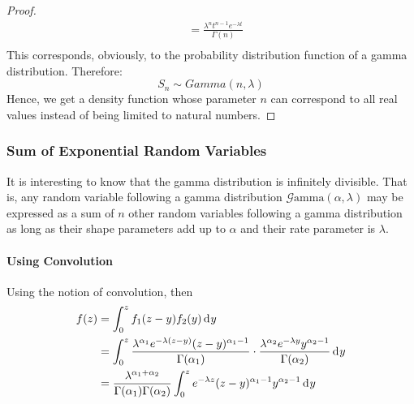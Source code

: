 \documentclass[12pt]{article}
\newcommand{\G}{\mathcal{G}}
\begin{document}
\begin{proof}
\begin{equation}
\begin{split}
						&=	\frac{\lambda^n t^{n-1} e^{-\lambda t}}{\Gamma(n)}\\
		\end{split}
	\end{equation}
	This corresponds, obviously, to the probability distribution function of a gamma distribution. Therefore:
	\begin{equation}
		S_n \sim Gamma(n, \lambda)
	\end{equation}
	Hence, we get a density function whose parameter $n$ can correspond to all real values instead of being limited to
	natural numbers.
\end{proof}


\pagebreak
\subsubsection{Sum of Exponential Random Variables}
It is interesting to know that the gamma distribution is infinitely divisible. That is, any random variable following a
gamma distribution $\G\text{amma}(\alpha, \lambda)$ may be expressed as a sum of $n$ other random variables following a
gamma distribution as long as their shape parameters add up to $\alpha$ and their rate parameter is $\lambda$.
\paragraph{Using Convolution}
Using the notion of convolution, then
\begin{equation}
    \begin{split}
        f(z)	&=	\int_{0}^{z} f_1 (z-y) f_2 (y) \mathop{}\!\mathrm{d^{}}y\\
				&=	\int_{0}^{z}\frac{\lambda^{\alpha_1} e^{-\lambda(z-y)} (z-y)^{\alpha_1 -1}}{\Gamma(\alpha_1)} \cdot \frac{\lambda^{\alpha_2} e^{-\lambda y}y^{\alpha_2 -1}}{\Gamma(\alpha_2)}\mathop{}\!\mathrm{d^{}}y\\
				&=	\frac{\lambda^{\alpha_1+\alpha_2}}{\Gamma(\alpha_1) \Gamma(\alpha_2)}\int_{0}^{z}e^{-\lambda z}(z-y)^{\alpha_1 -1}y^{\alpha_2 -1}\mathop{}\!\mathrm{d^{}}y\\
    \end{split}
\end{equation}
\end{document}
